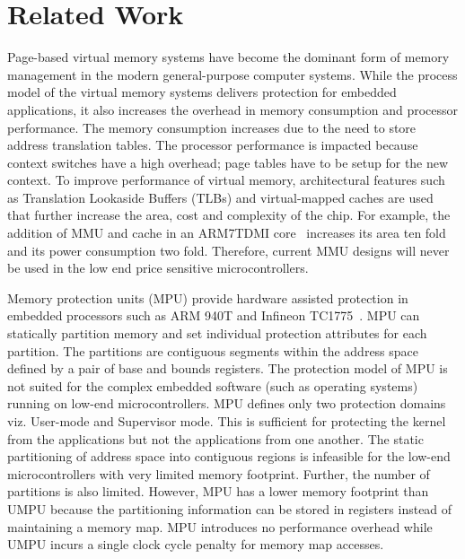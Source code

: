 \section{Related Work}
\label{sec:related}
%
Page-based virtual memory systems have become the dominant form of
memory management in the modern general-purpose computer systems.
%
While the process model of the virtual memory systems delivers protection for embedded applications, it also increases the overhead in memory consumption and processor performance.
%
The memory consumption increases due to the need to store address translation tables.
%
The processor performance is impacted because context switches have a high overhead; page tables have to be setup for the new context.
%
To improve performance of virtual memory, architectural features such as Translation Lookaside Buffers (TLBs) and virtual-mapped caches are used that further increase the area, cost and complexity of the chip.
%
For example, the addition of MMU and cache in an ARM7TDMI core~\cite{arm7tdmi} increases its area ten fold and its power consumption two fold. 
%
Therefore, current MMU designs will never be used in the low end price sensitive microcontrollers.

%
Memory protection units (MPU) provide hardware assisted protection in  embedded processors such as ARM
940T \cite{arm940tds} and Infineon TC1775~\cite{inftc1775ds}.
%
MPU can statically partition memory and set individual protection attributes for each partition.
%
The partitions are contiguous segments within the address space defined by a pair of base and bounds registers.
%
The protection model of MPU is not suited for the complex embedded
software (such as operating systems) running on low-end microcontrollers.
%
MPU defines only two protection domains viz. User-mode and Supervisor
mode.
%
This is sufficient for protecting the kernel from the applications but
not the applications from one another.
%
The static partitioning of address space into contiguous regions is
infeasible for the low-end microcontrollers with very limited memory
footprint.
%
Further, the number of partitions is also limited.
%
However, MPU has a lower memory footprint than UMPU because the
partitioning information can be stored in registers instead of
maintaining a memory map.
%
MPU introduces no performance overhead while UMPU incurs a single
clock cycle penalty for memory map accesses.
%



